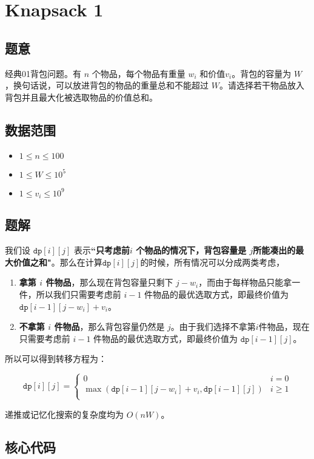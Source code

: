 \section{Knapsack 1}
\subsection*{题意}
经典01背包问题。有 $n$ 个物品，每个物品有重量 $w_i$ 和价值$v_i$。背包的容量为 $W$，换句话说，可以放进背包的物品的重量总和不能超过 $W$。请选择若干物品放入背包并且最大化被选取物品的价值总和。
\subsection*{数据范围}
\begin{itemize}
\item $1 \leq n \leq 100$
\item $1 \leq W \leq 10^5$
\item $1 \leq v_i \leq 10^9$
\end{itemize}
\subsection*{题解}

我们设 {${\texttt{dp}[i][j]}$} 表示\textbf{``只考虑前$i$ 个物品的情况下，背包容量是 $j$所能凑出的最大价值之和"}。那么在计算${\texttt{dp}[i][j]}$的时候，所有情况可以分成两类考虑，
\begin{enumerate}
    \item \textbf{拿第 $i$ 件物品}，那么现在背包容量只剩下 $j - w_i$，而由于每样物品只能拿一件，所以我们只需要考虑前 $i-1$ 件物品的最优选取方式，即最终价值为 $\texttt{dp}[i-1][j-w_i] + v_i$。
    \item \textbf{不拿第 $i$ 件物品}，那么背包容量仍然是 $j$。由于我们选择不拿第$i$件物品，现在只需要考虑前 $i-1$ 件物品的最优选取方式，即最终价值为 ${\texttt{dp}[i-1][j]}$。
\end{enumerate}

所以可以得到转移方程为：

\begin{equation*}
{\texttt{dp}[i][j]} = 
\begin{cases}
 0 & i = 0\\
\max({\texttt{dp}}[i-1][j-w_i] + v_i,{\texttt{dp}}[i-1][j]) & i \ge 1\\
\end{cases}
\end{equation*}

递推或记忆化搜索的复杂度均为 $O(nW)$。


\subsection*{核心代码}
\inputminted[linenos,autogobble]{cpp}{./Code/D.cpp}
\newpage